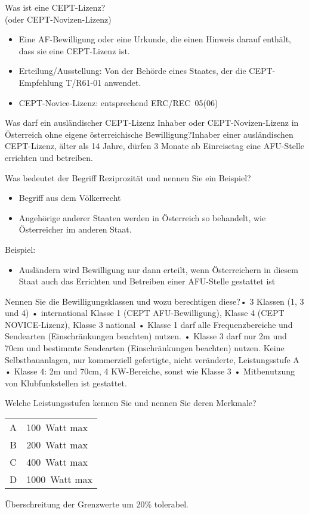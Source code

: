 \documentclass[avery5371,grid,frame,a4paper]{flashcards}
\newcommand{\card}[3]{
  \begin{flashcard}[{\chap} -- #1]{#2}#3\end{flashcard}
}
\begin{document}
\card{38}{Was ist eine CEPT-Lizenz? \\ (oder CEPT-Novizen-Lizenz)}{
  \begin{itemize}\itemsep1pt
    \item Eine AF-Bewilligung oder eine Urkunde, die einen Hinweis darauf enthält, dass sie eine CEPT-Lizenz ist.
    \item Erteilung/Ausstellung: Von der Behörde eines Staates, der die CEPT-Empfehlung T/R61-01 anwendet.
    \item CEPT-Novice-Lizenz: entsprechend ERC/REC~05(06)
  \end{itemize}
}

\card{39}{Was darf ein ausländischer CEPT-Lizenz Inhaber oder CEPT-Novizen-Lizenz in Österreich ohne eigene österreichische Bewilligung?}{Inhaber einer ausländischen CEPT-Lizenz, älter als 14 Jahre, dürfen 3 Monate ab Einreisetag eine AFU-Stelle errichten und betreiben.}

\card{40}{Was bedeutet der Begriff Reziprozität und nennen Sie ein Beispiel?}{
  \begin{itemize}\itemsep1pt
    \item Begriff aus dem Völkerrecht
    \item Angehörige anderer Staaten werden in Österreich so behandelt, wie Österreicher im anderen Staat.
  \end{itemize}
  Beispiel:
  \begin{itemize}\itemsep1pt
    \item Ausländern wird Bewilligung nur dann erteilt, wenn Österreichern in diesem Staat auch das Errichten und Betreiben einer AFU-Stelle gestattet ist
  \end{itemize}
}

\card{41}{Nennen Sie die Bewilligungsklassen und wozu berechtigen diese?}{•  3 Klassen (1, 3 und 4) •  international Klasse 1 (CEPT AFU-Bewilligung), Klasse 4 (CEPT NOVICE-Lizenz), Klasse 3 national •  Klasse 1 darf alle Frequenzbereiche und Sendearten (Einschränkungen beachten) nutzen. •  Klasse 3 darf nur 2m und 70cm und bestimmte Sendearten (Einschränkungen beachten) nutzen. Keine Selbstbauanlagen, nur kommerziell gefertigte, nicht veränderte, Leistungsstufe A •  Klasse 4: 2m und 70cm, 4 KW-Bereiche, sonst wie Klasse 3 •  Mitbenutzung von Klubfunkstellen ist gestattet.}

\card{42}{Welche Leistungsstufen kennen Sie und nennen Sie deren Merkmale?}{
  \begin{center}
    \vspace{5pt}
    \begin{tabular}{cl}
      A & 100~Watt max \\
      B & 200~Watt max \\
      C & 400~Watt max \\
      D & 1000~Watt max
    \end{tabular}
  \end{center}
  Überschreitung der Grenzwerte um 20\% tolerabel.
}
\end{document}
